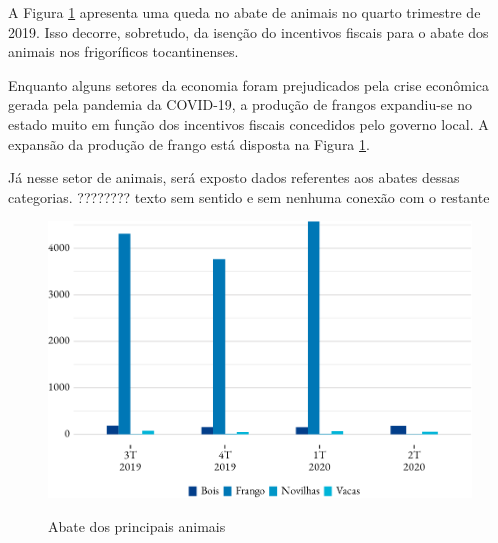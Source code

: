 \par A Figura \ref{fig:abate} apresenta uma queda no abate de animais no quarto trimestre de 2019. Isso decorre, sobretudo, da isenção do incentivos fiscais para o abate dos animais nos frigoríficos tocantinenses.

\par Enquanto alguns setores da economia foram prejudicados pela crise econômica gerada pela pandemia da COVID-19, a produção de frangos expandiu-se no estado muito em função dos incentivos fiscais concedidos pelo governo local. A expansão da produção de frango está disposta na Figura \ref{fig:abate}.

\par{\color{red} Já nesse setor de animais, será exposto dados referentes aos abates dessas categorias. ???????? texto sem sentido e sem nenhuma conexão com o restante}


\begin{figure}[!h]
	\caption{Abate dos principais animais}
	\includegraphics{fig/abates-1.pdf}
	\label{fig:abate}
	\notes{\trimestres}
\end{figure}
